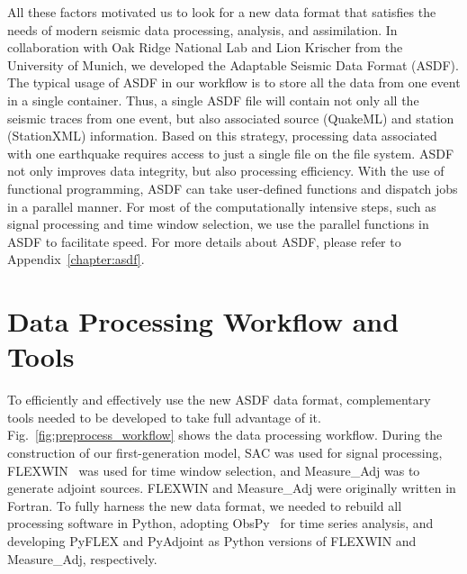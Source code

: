 All these factors motivated us to
look for a new data format that satisfies the needs of modern seismic data processing, analysis, and assimilation.
In collaboration with Oak Ridge National Lab and Lion Krischer from the University of Munich, we developed the Adaptable Seismic Data Format (ASDF).
The typical usage of ASDF in our workflow is to store all the data from one
event in a single container.
Thus, a single ASDF file will contain not only all the seismic traces from one
event, but also associated source (QuakeML) and station (StationXML) information.
Based on this strategy,
processing data associated with one earthquake requires access to just a single file on the file system.
ASDF not only improves data integrity, but also processing efficiency.
With the use of functional programming, ASDF can take user-defined functions and dispatch jobs in a parallel manner.
For most of the computationally intensive steps, such as signal
processing and time window selection, we use the parallel functions in ASDF
to facilitate speed.
For more details about ASDF, please refer to Appendix~\ref{chapter:asdf}.

\section{Data Processing Workflow and Tools}
\label{section:data_processing}

To efficiently and effectively use the new ASDF data format,
complementary tools needed to be developed to take full advantage of it.
Fig.~\ref{fig:preprocess_workflow} shows the data processing workflow.
During the construction of our first-generation model,
SAC was used for signal processing,
FLEXWIN~\cite{maggi2009automated} was used for time window selection,
and Measure\_Adj was to generate adjoint sources.
FLEXWIN and Measure\_Adj were originally written in Fortran.
To fully harness the new data format,
we needed to rebuild all processing software in Python,
adopting ObsPy~\cite{obspy2010} for time series analysis,
and developing PyFLEX and PyAdjoint as Python versions of FLEXWIN and Measure\_Adj,
respectively.


